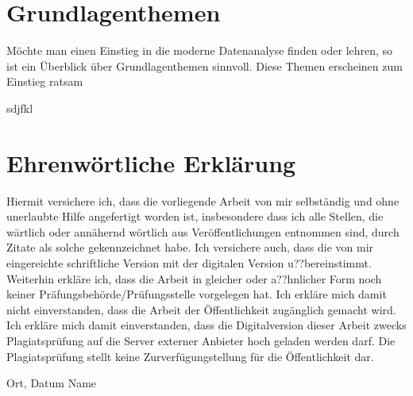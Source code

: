 \hypertarget{refs}{}

\printbibliography

\hypertarget{appendix-appendix}{%
\appendix {}}


\hypertarget{grundlagenthemen}{%
\chapter{Grundlagenthemen}\label{grundlagenthemen}}

Möchte man einen Einstieg in die moderne Datenanalyse finden oder lehren, so ist ein Überblick über Grundlagenthemen sinnvoll. Diese Themen erscheinen zum Einstieg ratsam

sdjfkl

\hypertarget{ehrenwortliche-erklarung}{%
\chapter{Ehrenwörtliche Erklärung}\label{ehrenwortliche-erklarung}}

Hiermit versichere ich, dass die vorliegende Arbeit von mir selbständig und ohne unerlaubte Hilfe angefertigt worden ist, insbesondere dass ich alle Stellen, die wärtlich oder annähernd wörtlich aus Veröffentlichungen entnommen sind, durch Zitate als solche gekennzeichnet habe. Ich versichere auch, dass die von mir eingereichte schriftliche Version mit der digitalen Version u??bereinstimmt. Weiterhin erkläre ich, dass die Arbeit in gleicher oder a??hnlicher Form noch keiner Präfungsbehörde/Prüfungsstelle vorgelegen hat. Ich erkläre mich damit nicht einverstanden, dass die Arbeit der Öffentlichkeit zugänglich gemacht wird. Ich erkläre mich damit einverstanden, dass die Digitalversion dieser Arbeit zwecks Plagiatsprüfung auf die Server externer Anbieter hoch geladen werden darf. Die Plagiatsprüfung stellt keine Zurverfügungstellung für die Öffentlichkeit dar.

\vspace{7cm}

Ort, Datum \hspace{5cm} Name


\label{app:bibliography} %

\manualmark
\markboth{\spacedlowsmallcaps{\bibname}}{\spacedlowsmallcaps{\bibname}} 












